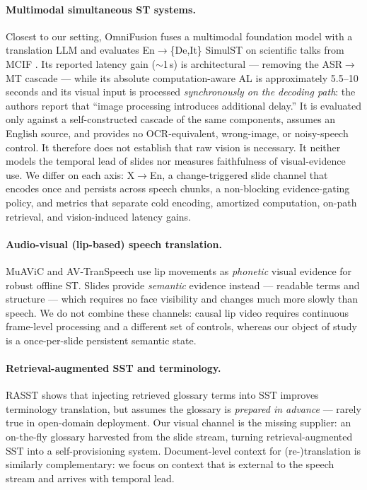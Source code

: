 \paragraph{Multimodal simultaneous ST systems.}
Closest to our setting, OmniFusion \citep{koneru2025omnifusion} fuses a multimodal
foundation model with a translation LLM and evaluates En$\rightarrow$\{De,It\}
SimulST on scientific talks from MCIF \citep{papi2025mcif}. Its reported latency
gain ($\sim$1\,s) is architectural --- removing the ASR$\rightarrow$MT cascade
--- while its absolute computation-aware AL is approximately 5.5--10 seconds and
its visual input is processed \emph{synchronously on the decoding path}: the
authors report that ``image processing introduces additional delay.'' It is
evaluated only against a self-constructed cascade of the same components, assumes
an English source, and provides no OCR-equivalent, wrong-image, or noisy-speech
control. It therefore does not establish that raw vision is necessary. It neither
models the temporal lead of slides nor measures faithfulness of visual-evidence
use. We differ on each axis: X$\rightarrow$En, a change-triggered slide channel
that encodes once and persists across speech chunks, a non-blocking
evidence-gating policy, and metrics that separate cold encoding, amortized
computation, on-path retrieval, and vision-induced latency gains.

\paragraph{Audio-visual (lip-based) speech translation.}
MuAViC \citep{anwar2023muavic} and AV-TranSpeech \citep{huang2023avtranspeech} use
lip movements as \emph{phonetic} visual evidence for robust offline ST. Slides
provide \emph{semantic} evidence instead --- readable terms and structure --- which
requires no face visibility and changes much more slowly than speech. We do not
combine these channels: causal lip video requires continuous frame-level
processing and a different set of controls, whereas our object of study is a
once-per-slide persistent semantic state.

\paragraph{Retrieval-augmented SST and terminology.}
RASST \citep{luo2026rasst} shows that injecting retrieved glossary terms into SST
improves terminology translation, but assumes the glossary is \emph{prepared in
advance} --- rarely true in open-domain deployment. Our visual channel is the
missing supplier: an on-the-fly glossary harvested from the slide stream,
turning retrieval-augmented SST into a self-provisioning system. Document-level
context for (re-)translation \citep{zhang2021beyond} is similarly complementary:
we focus on context that is external to the speech stream and arrives with
temporal lead.

